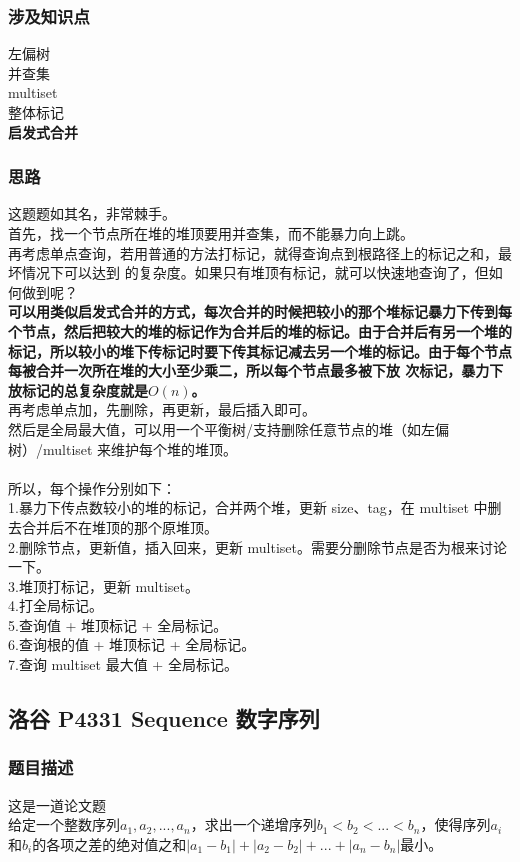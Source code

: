 		\subsubsection{涉及知识点}
			左偏树\\
			并查集\\
			multiset\\
			整体标记\\
			\textbf{启发式合并}
		\subsubsection{思路}
			这题题如其名，非常棘手。\\
			首先，找一个节点所在堆的堆顶要用并查集，而不能暴力向上跳。\\
			再考虑单点查询，若用普通的方法打标记，就得查询点到根路径上的标记之和，最坏情况下可以达到  的复杂度。如果只有堆顶有标记，就可以快速地查询了，但如何做到呢？\\
			\textbf{可以用类似启发式合并的方式，每次合并的时候把较小的那个堆标记暴力下传到每个节点，然后把较大的堆的标记作为合并后的堆的标记。由于合并后有另一个堆的标记，所以较小的堆下传标记时要下传其标记减去另一个堆的标记。由于每个节点每被合并一次所在堆的大小至少乘二，所以每个节点最多被下放  次标记，暴力下放标记的总复杂度就是$O(n)$。}\\
			再考虑单点加，先删除，再更新，最后插入即可。\\
			然后是全局最大值，可以用一个平衡树/支持删除任意节点的堆（如左偏树）/multiset 来维护每个堆的堆顶。\\\\
			所以，每个操作分别如下：\\
			1.暴力下传点数较小的堆的标记，合并两个堆，更新 size、tag，在 multiset 中删去合并后不在堆顶的那个原堆顶。\\
			2.删除节点，更新值，插入回来，更新 multiset。需要分删除节点是否为根来讨论一下。\\
			3.堆顶打标记，更新 multiset。\\
			4.打全局标记。\\
			5.查询值 + 堆顶标记 + 全局标记。\\
			6.查询根的值 + 堆顶标记 + 全局标记。\\
			7.查询 multiset 最大值 + 全局标记。
	\subsection{洛谷 P4331 Sequence 数字序列}
		\subsubsection{题目描述}
			这是一道论文题\\
			给定一个整数序列$a_1, a_2, ... , a_n$，求出一个递增序列$b_1 < b_2 < ... < b_n$，使得序列$a_i$和$b_i$的各项之差的绝对值之和$|a_1 - b_1| + |a_2 - b_2| + ... + |a_n - b_n|$最小。
